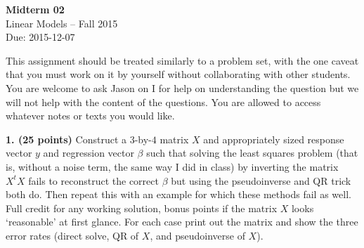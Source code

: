 \documentclass[12pt]{article}
\begin{document}
\begin{center}
{\bf Midterm 02} \\
Linear Models -- Fall 2015 \\
Due: 2015-12-07
\end{center}

\medskip

This assignment should be treated similarly to a problem set, with the one
caveat that you must work on it by yourself without collaborating with other
students. You are welcome to ask Jason on I for help on understanding the
question but we will not help with the content of the questions. You are allowed
to access whatever notes or texts you would like.

{\bf 1. (25 points)} Construct a $3$-by-$4$ matrix $X$ and appropriately sized
response vector $y$ and regression vector $\beta$ such that solving the least squares
problem (that is, without a noise term, the same way I did in class) by inverting
the matrix $X^t X$ fails to reconstruct the correct $\beta$ but using the pseudoinverse
and QR trick both do. Then repeat this with an example for which these methods fail
as well. Full credit for any working solution, bonus points if the matrix $X$ looks
`reasonable' at first glance. For each case print out the matrix and show the three
error rates (direct solve, QR of $X$, and pseudoinverse of $X$).

\end{document}
